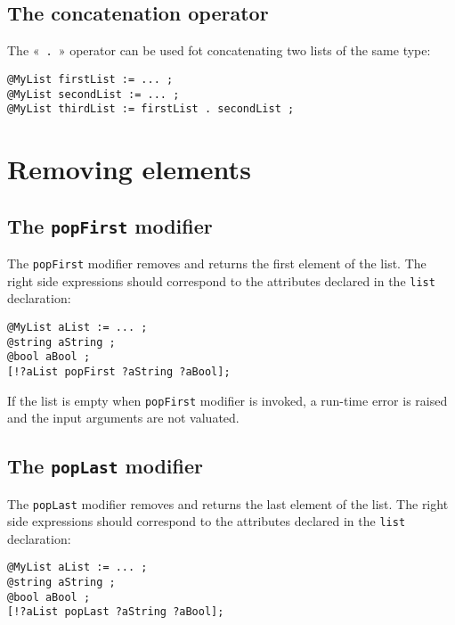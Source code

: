 \subsection{The concatenation operator}

The «~\lstinline[language=galgas]!.!~» operator can be used fot concatenating two lists of the same type:


\begin{lstlisting}[language=galgas]
@MyList firstList := ... ;
@MyList secondList := ... ;
@MyList thirdList := firstList . secondList ;
\end{lstlisting}

\section{Removing elements}

\subsection{The \lstinline[language=galgas]!popFirst! modifier}


The \lstinline[language=galgas]!popFirst! modifier removes and returns the first element of the list. The right side expressions should correspond to the attributes declared in the \lstinline[language=galgas]!list! declaration:\\

\begin{lstlisting}[language=galgas]
@MyList aList := ... ;
@string aString ;
@bool aBool ;
[!?aList popFirst ?aString ?aBool];
\end{lstlisting}

If the list is empty when \lstinline[language=galgas]!popFirst! modifier is invoked, a run-time error is raised and the input arguments are not valuated.

\subsection{The \lstinline[language=galgas]!popLast! modifier}


The \lstinline[language=galgas]!popLast! modifier removes and returns the last element of the list. The right side expressions should correspond to the attributes declared in the \lstinline[language=galgas]!list! declaration:

\begin{lstlisting}[language=galgas]
@MyList aList := ... ;
@string aString ;
@bool aBool ;
[!?aList popLast ?aString ?aBool];
\end{lstlisting}

